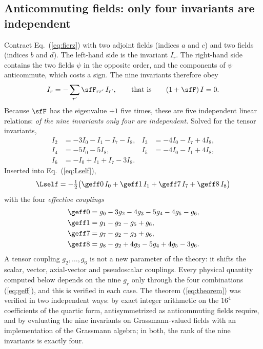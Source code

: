 \subsection{Anticommuting fields: only four invariants are independent}
\label{sec:four}

Contract Eq.~(\ref{eq:fierz}) with two adjoint fields (indices $a$ and $c$) and two fields (indices
$b$ and $d$). The left-hand side is the invariant $I_r$. The right-hand side contains the two fields
$\psi$ in the opposite order, and the components of $\psi$ anticommute, which costs a sign. The nine
invariants therefore obey
\begin{equation}
I_r=-\sum_{r'}\sfF_{rr'}\,I_{r'},\qquad\text{that is}\qquad(1+\sfF)\,I=0 .
\label{eq:theorem}
\end{equation}
Because $\sfF$ has the eigenvalue $+1$ five times, these are five independent linear relations:
\emph{of the nine invariants only four are independent.} Solved for the tensor invariants,
\begin{equation}
\begin{aligned}
I_2&=-3I_0-I_1-I_7-I_8, & I_3&=-4I_0-I_7+4I_8,\\
I_4&=-5I_0-5I_8, & I_5&=-4I_0-I_1+4I_8,\\
I_6&=-I_0+I_1+I_7-3I_8 .
\end{aligned}
\label{eq:reduction}
\end{equation}
Inserted into Eq.~(\ref{eq:Lself}),
\begin{equation}
\Lself=-\tfrac12\big(\geff0\,I_0+\geff1\,I_1+\geff7\,I_7+\geff8\,I_8\big)
\label{eq:Lself4}
\end{equation}
with the four \emph{effective couplings}
\begin{equation}
\begin{aligned}
\geff0&=g_0-3g_2-4g_3-5g_4-4g_5-g_6,\\
\geff1&=g_1-g_2-g_5+g_6,\\
\geff7&=g_7-g_2-g_3+g_6,\\
\geff8&=g_8-g_2+4g_3-5g_4+4g_5-3g_6 .
\end{aligned}
\label{eq:geff}
\end{equation}
A tensor coupling $g_2,\dots,g_6$ is not a new parameter of the theory: it shifts the scalar,
vector, axial-vector and pseudoscalar couplings. Every physical quantity computed below depends on
the nine $g_r$ only through the four combinations (\ref{eq:geff}), and this is verified in each case.
The theorem (\ref{eq:theorem}) was verified in two independent ways: by exact integer
arithmetic on the $16^{4}$ coefficients of the quartic form, antisymmetrized as anticommuting fields
require, and by evaluating the nine invariants on Grassmann-valued fields with an implementation of
the Grassmann algebra; in both, the rank of the nine invariants is exactly four.

